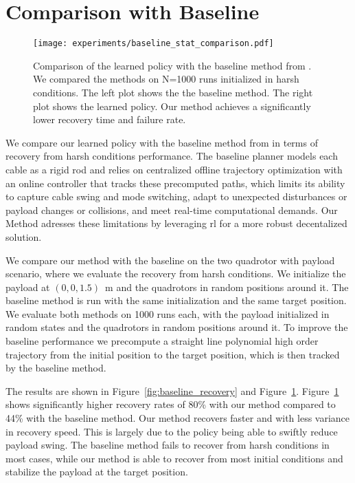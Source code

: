 \section{Comparison with Baseline}
\begin{figure}[H]
    \centering
    
    \texttt{[image: experiments/baseline\_stat\_comparison.pdf]}
    \caption[Baseline vs \gls{rl} Performance]{Comparison of the learned policy with the baseline method from \autocite{wahba_kinodynamic_2024}. We compared the methods on N=1000 runs initialized in harsh conditions. The left plot shows the the baseline method. The right plot shows the learned policy. Our method achieves a significantly lower recovery time and failure rate.}
    \label{fig:baseline_histogram_comparison}

\end{figure}
We compare our learned policy with the baseline method from \autocite{wahba_kinodynamic_2024} in terms of recovery from harsh conditions performance. The baseline planner models each cable as a rigid rod and relies on centralized offline trajectory optimization with an online controller that tracks these precomputed paths, which limits its ability to capture cable swing and mode switching, adapt to unexpected disturbances or payload changes or collisions, and meet real-time computational demands. Our Method adresses these limitations by leveraging \gls{rl} for a more robust decentalized solution.

We compare our method with the baseline on the two quadrotor with payload scenario, where we evaluate the recovery from harsh conditions. We initialize the payload at $(0,0,1.5)$~m and the quadrotors in random positions around it. The baseline method is run with the same initialization and the same target position. We evaluate both methods on 1000 runs each, with the payload initialized in random states and the quadrotors in random positions around it. To improve the baseline performance we precompute a straight line polynomial high order trajectory from the initial position to the target position, which is then tracked by the baseline method.

The results are shown in Figure~\ref{fig:baseline_recovery} and Figure~\ref{fig:baseline_histogram_comparison}.
Figure~\ref{fig:baseline_histogram_comparison} shows significantly higher recovery rates of 80\% with our method compared to 44\% with the baseline method. Our method recovers faster and with less variance in recovery speed. This is largely due to the policy being able to swiftly reduce payload swing. The baseline method fails to recover from harsh conditions in most cases, while our method is able to recover from most initial conditions and stabilize the payload at the target position.

